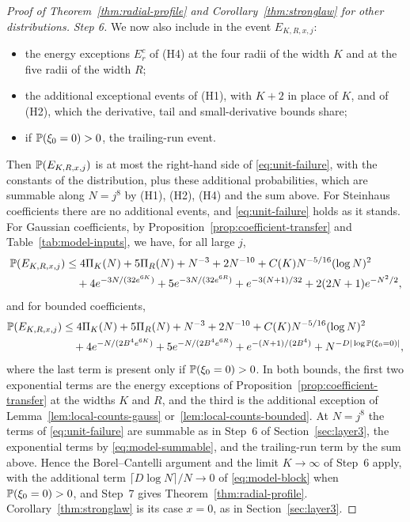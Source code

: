 \begin{proof}[Proof of Theorem~\ref{thm:radial-profile} and Corollary~\ref{thm:stronglaw} for other distributions]
\emph{Step 6.}
We now also include in the event $E_{K,R,x,j}$:
\begin{itemize}
\item the energy exceptions $E_r^c$ of (H4) at the four radii of the
 width $K$ and at the five radii of the width $R$;
\item the additional exceptional events of (H1), with $K+2$ in place of
 $K$, and of (H2), which the derivative, tail and small-derivative bounds
 share;
\item if $\mathbb P(\xi_0=0)>0$, the trailing-run event.
\end{itemize}
Then $\mathbb P(E_{K,R,x,j})$ is at most the right-hand side of
\eqref{eq:unit-failure}, with the constants of the distribution, plus
these additional probabilities, which are summable along $N=j^8$ by
(H1), (H2), (H4) and the sum above.
For Steinhaus coefficients there are no additional events, and
\eqref{eq:unit-failure} holds as it stands.
For Gaussian coefficients, by Proposition~\ref{prop:coefficient-transfer}
and Table~\ref{tab:model-inputs}, we have, for all large $j$,
\begin{align*}
 \mathbb P(E_{K,R,x,j})
 &\le4\Pi_K(N)+5\Pi_R(N)+N^{-3}+2N^{-10}+C(K)N^{-5/16}(\log N)^2\\
 &\quad+4e^{-3N/(32e^{6K})}+5e^{-3N/(32e^{6R})}+e^{-3(N+1)/32}
 +2(2N+1)e^{-N^2/2},
\end{align*}
and for bounded coefficients,
\begin{align*}
 \mathbb P(E_{K,R,x,j})
 &\le4\Pi_K(N)+5\Pi_R(N)+N^{-3}+2N^{-10}+C(K)N^{-5/16}(\log N)^2\\
 &\quad+4e^{-N/(2B^4e^{6K})}+5e^{-N/(2B^4e^{6R})}+e^{-(N+1)/(2B^4)}
 +N^{-D|\log\mathbb P(\xi_0=0)|},
\end{align*}
where the last term is present only if $\mathbb P(\xi_0=0)>0$.
In both bounds, the first two exponential terms are the energy
exceptions of Proposition~\ref{prop:coefficient-transfer} at the widths
$K$ and $R$, and the third is the additional exception of
Lemma~\ref{lem:local-counts-gauss} or~\ref{lem:local-counts-bounded}.
At $N=j^8$ the terms of \eqref{eq:unit-failure} are summable as in
Step~6 of Section~\ref{sec:layer3}, the exponential terms by
\eqref{eq:model-summable}, and the trailing-run term by the sum above.
Hence the Borel--Cantelli argument and the limit $K\to\infty$ of Step~6
apply, with the additional term $\lceil D\log N\rceil/N\to0$ of
\eqref{eq:model-block} when $\mathbb P(\xi_0=0)>0$, and Step~7 gives
Theorem~\ref{thm:radial-profile}.
Corollary~\ref{thm:stronglaw} is its case $x=0$, as in
Section~\ref{sec:layer3}.
\end{proof}
